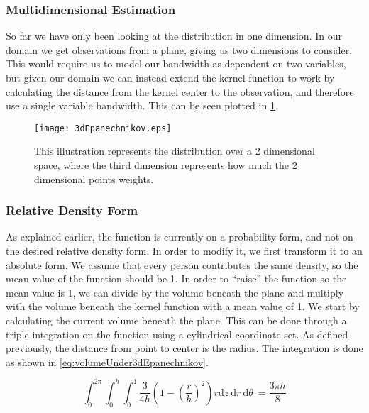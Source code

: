 \subsubsection{Multidimensional Estimation}

So far we have only been looking at the distribution in one dimension. In our domain we get observations from a plane, giving us two dimensions to consider. This would require us to model our bandwidth as dependent on two variables, but given our domain we can instead extend the kernel function to work by calculating the distance from the kernel center to the observation, and therefore use a single variable bandwidth. This can be seen plotted in \cref{fig:3dEpanechnikov}.

\begin{figure}[htbp]
\centering
    \texttt{[image: 3dEpanechnikov.eps]}
    \caption{This illustration represents the distribution over a 2 dimensional space, where the third dimension represents how much the 2 dimensional points weights.}
    \label{fig:3dEpanechnikov}
\end{figure}

\subsubsection{Relative Density Form}

As explained earlier, the function is currently on a probability form, and not on the desired relative density form. In order to modify it, we first transform it to an absolute form. We assume that every person contributes the same density, so the mean value of the function should be 1. In order to \enquote{raise} the function so the mean value is 1, we can divide by the volume beneath the plane and multiply with the volume beneath the kernel function with a mean value of 1. We start by calculating the current volume beneath the plane. This can be done through a triple integration on the function using a cylindrical coordinate set. As defined previously, the distance from point to center is the radius. The integration is done as shown in \cref{eq:volumeUnder3dEpanechnikov}.


\begin{equation}
\label{eq:volumeUnder3dEpanechnikov}
\int_0^{2 \pi} \int_0^h \int_0^1 \frac{3}{4 h} \left(1 - \left(\frac{r}{h}\right)^2\right) r \mathrm{ d}z\ \mathrm{d}r\ \mathrm{d}\theta\ = \frac{3 \pi h}{8}
\end{equation}

